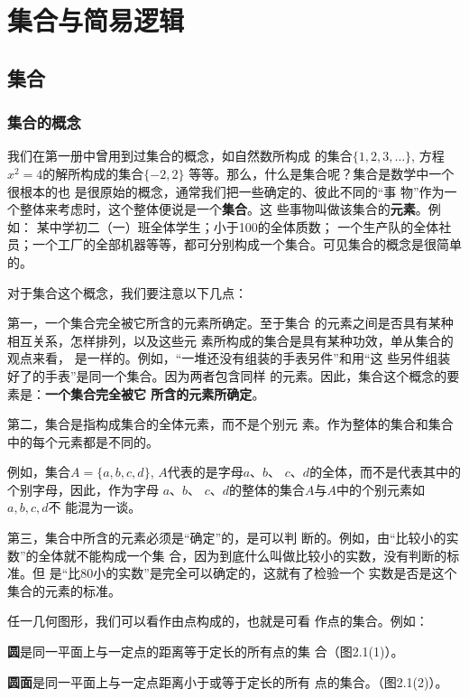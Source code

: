 \chapter{集合与简易逻辑}

 \section{集合}
\subsection{集合的概念}
我们在第一册中曾用到过集合的概念，如自然数所构成
的集合$\{1,2,3,\ldots\}$, 方程$x^2=4$的解所构成的集合$\{-2,2\}$
等等。那么，什么是集合呢？集合是数学中一个很根本的也
是很原始的概念，通常我们把一些确定的、彼此不同的“事
物”作为一个整体来考虑时，这个整体便说是一个\textbf{集合}。这
些事物叫做该集合的\textbf{元素}。例如：
某中学初二（一）班全体学生；小于100的全体质数；
一个生产队的全体社员；一个工厂的全部机器等等，都可分别构成一个集合。可见集合的概念是很简单
的。

对于集合这个概念，我们要注意以下几点：

第一，一个集合完全被它所含的元素所确定。至于集合
的元素之间是否具有某种相互关系，怎样排列，以及这些元
素所构成的集合是具有某种功效，单从集合的观点来看，
是一样的。例如，“一堆还没有组装的手表另件”和用“这
些另件组装好了的手表”是同一个集合。因为两者包含同样
的元素。因此，集合这个概念的要素是：\textbf{一个集合完全被它
所含的元素所确定}。

第二，集合是指构成集合的全体元素，而不是个别元
素。作为整体的集合和集合中的每个元素都是不同的。

例如，集合$A=\{a,b,c,d\}$, $A$代表的是字母$a$、$b$、
$c$、$d$的全体，而不是代表其中的个别字母，因此，作为字母
$a$、$b$、
$c$、$d$的整体的集合$A$与$A$中的个别元素如$a,b,c,d$不
能混为一谈。

第三，集合中所含的元素必须是“确定”的，是可以判
断的。例如，由“比较小的实数”的全体就不能构成一个集
合，因为到底什么叫做比较小的实数，没有判断的标准。但
是“比80小的实数”是完全可以确定的，这就有了检验一个
实数是否是这个集合的元素的标准。

任一几何图形，我们可以看作由点构成的，也就是可看
作点的集合。例如：

\textbf{圆}是同一平面上与一定点的距离等于定长的所有点的集
合（图2.1(1)）。

\textbf{圆面}是同一平面上与一定点距离小于或等于定长的所有
点的集合。（图2.1(2)）。

